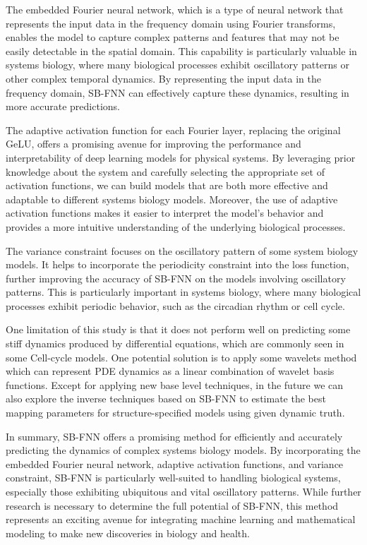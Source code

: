 The embedded Fourier neural network, which is a type of neural network that represents the input data in the frequency domain using Fourier transforms, enables the model to capture complex patterns and features that may not be easily detectable in the spatial domain. This capability is particularly valuable in systems biology, where many biological processes exhibit oscillatory patterns or other complex temporal dynamics. By representing the input data in the frequency domain, SB-FNN can effectively capture these dynamics, resulting in more accurate predictions.

The adaptive activation function for each Fourier layer, replacing the original GeLU, offers a promising avenue for improving the performance and interpretability of deep learning models for physical systems. By leveraging prior knowledge about the system and carefully selecting the appropriate set of activation functions, we can build models that are both more effective and adaptable to different systems biology models. Moreover, the use of adaptive activation functions makes it easier to interpret the model's behavior and provides a more intuitive understanding of the underlying biological processes.

The variance constraint focuses on the oscillatory pattern of some system biology models. It helps to incorporate the periodicity constraint into the loss function, further improving the accuracy of SB-FNN on the models involving oscillatory patterns. This is particularly important in systems biology, where many biological processes exhibit periodic behavior, such as the circadian rhythm or cell cycle.

One limitation of this study is that it does not perform well on predicting some stiff dynamics produced by differential equations, which are commonly seen in some Cell-cycle models. One potential solution is to apply some wavelets method which can represent PDE dynamics as a linear combination of wavelet basis functions. Except for applying new base level techniques, in the future we can also explore the inverse techniques based on SB-FNN to estimate the best mapping parameters for structure-specified models using given dynamic truth.

In summary, SB-FNN offers a promising method for efficiently and accurately predicting the dynamics of complex systems biology models. By incorporating the embedded Fourier neural network, adaptive activation functions, and variance constraint, SB-FNN is particularly well-suited to handling biological systems, especially those exhibiting ubiquitous and vital oscillatory patterns. While further research is necessary to determine the full potential of SB-FNN, this method represents an exciting avenue for integrating machine learning and mathematical modeling to make new discoveries in biology and health.